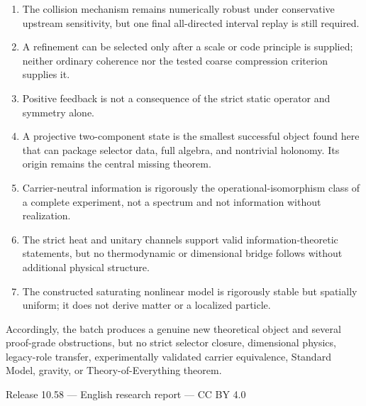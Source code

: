 \documentclass[11pt,a4paper]{article}
\begin{document}
\begin{enumerate}
\item The collision mechanism remains numerically robust under conservative upstream sensitivity, but one final all-directed interval replay is still required.
\item A refinement can be selected only after a scale or code principle is supplied; neither ordinary coherence nor the tested coarse compression criterion supplies it.
\item Positive feedback is not a consequence of the strict static operator and symmetry alone.
\item A projective two-component state is the smallest successful object found here that can package selector data, full algebra, and nontrivial holonomy. Its origin remains the central missing theorem.
\item Carrier-neutral information is rigorously the operational-isomorphism class of a complete experiment, not a spectrum and not information without realization.
\item The strict heat and unitary channels support valid information-theoretic statements, but no thermodynamic or dimensional bridge follows without additional physical structure.
\item The constructed saturating nonlinear model is rigorously stable but spatially uniform; it does not derive matter or a localized particle.
\end{enumerate}

Accordingly, the batch produces a genuine new theoretical object and several proof-grade obstructions, but no strict selector closure, dimensional physics, legacy-role transfer, experimentally validated carrier equivalence, Standard Model, gravity, or Theory-of-Everything theorem.

\vfill
\begin{center}
\small
Release 10.58 --- English research report --- CC BY 4.0
\end{center}
\end{document}
